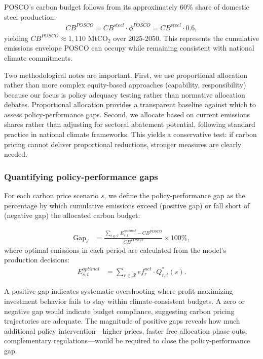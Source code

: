 POSCO's carbon budget follows from its approximately 60\% share of domestic steel production:
\begin{align}
CB^{POSCO} = CB^{steel} \cdot \phi^{POSCO} = CB^{steel} \cdot 0.6, \label{eq:posco_budget}
\end{align}
yielding $CB^{POSCO} \approx 1{,}110$ MtCO$_2$ over 2025-2050. This represents the cumulative emissions envelope POSCO can occupy while remaining consistent with national climate commitments.

Two methodological notes are important. First, we use proportional allocation rather than more complex equity-based approaches (capability, responsibility) because our focus is policy adequacy testing rather than normative allocation debates. Proportional allocation provides a transparent baseline against which to assess policy-performance gaps. Second, we allocate based on current emissions shares rather than adjusting for sectoral abatement potential, following standard practice in national climate frameworks. This yields a conservative test: if carbon pricing cannot deliver proportional reductions, stronger measures are clearly needed.

\subsubsection{Quantifying policy-performance gaps}

For each carbon price scenario $s$, we define the policy-performance gap as the percentage by which cumulative emissions exceed (positive gap) or fall short of (negative gap) the allocated carbon budget:

\begin{align}
\text{Gap}_s &= \frac{\sum_{t \in \mathcal{T}} E_{s,t}^{optimal} - CB^{POSCO}}{CB^{POSCO}} \times 100\%, \label{eq:gap}
\end{align}
where optimal emissions in each period are calculated from the model's production decisions:
\begin{align}
E_{s,t}^{optimal} &= \sum_{r \in \mathcal{R}} ef_r^{net} \cdot Q_{r,t}^*(s). \label{eq:optimal_emissions}
\end{align}

A positive gap indicates systematic overshooting where profit-maximizing investment behavior fails to stay within climate-consistent budgets. A zero or negative gap would indicate budget compliance, suggesting carbon pricing trajectories are adequate. The magnitude of positive gaps reveals how much additional policy intervention—higher prices, faster free allocation phase-outs, complementary regulations—would be required to close the policy-performance gap.

